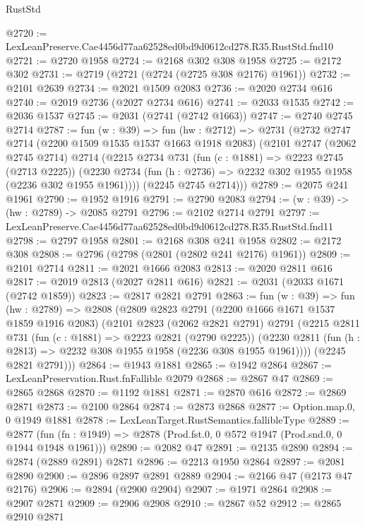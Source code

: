 \begin{lexlean}{RustStd}
\begin{coremodule}
@2720 := LexLeanPreserve.Cae4456d77aa62528ed0bd9d0612cd278.R35.RustStd.fnd10
@2721 := @2720 @1958
@2724 := @2168 @302 @308 @1958
@2725 := @2172 @302
@2731 := @2719 (@2721 (@2724 (@2725 @308 @2176) @1961))
@2732 := @2101 @2639
@2734 := @2021 @1509 @2083
@2736 := @2020 @2734 @616
@2740 := @2019 @2736 (@2027 @2734 @616)
@2741 := @2033 @1535
@2742 := @2036 @1537
@2745 := @2031 (@2741 (@2742 @1663))
@2747 := @2740 @2745 @2714
@2787 := fun (w : @39) =>
  fun (hw : @2712) =>
  @2731
    (@2732
      @2747
      @2714
      (@2200 @1509 @1535 @1537 @1663 @1918 @2083)
      (@2101
        @2747
        (@2062 @2745 @2714)
        @2714
        (@2215
          @2734
          @731
          (fun (c : @1881) => @2223 @2745 (@2713 @2225))
          (@2230 @2734 (fun (h : @2736) => @2232 @302 @1955 @1958 (@2236 @302 @1955 @1961))))
        (@2245 @2745 @2714)))
@2789 := @2075 @241 @1961
@2790 := @1952 @1916
@2791 := @2790 @2083
@2794 := (w : @39) -> (hw : @2789) -> @2085 @2791
@2796 := @2102 @2714 @2791
@2797 := LexLeanPreserve.Cae4456d77aa62528ed0bd9d0612cd278.R35.RustStd.fnd11
@2798 := @2797 @1958
@2801 := @2168 @308 @241 @1958
@2802 := @2172 @308
@2808 := @2796 (@2798 (@2801 (@2802 @241 @2176) @1961))
@2809 := @2101 @2714
@2811 := @2021 @1666 @2083
@2813 := @2020 @2811 @616
@2817 := @2019 @2813 (@2027 @2811 @616)
@2821 := @2031 (@2033 @1671 (@2742 @1859))
@2823 := @2817 @2821 @2791
@2863 := fun (w : @39) =>
  fun (hw : @2789) =>
  @2808
    (@2809
      @2823
      @2791
      (@2200 @1666 @1671 @1537 @1859 @1916 @2083)
      (@2101
        @2823
        (@2062 @2821 @2791)
        @2791
        (@2215
          @2811
          @731
          (fun (c : @1881) => @2223 @2821 (@2790 @2225))
          (@2230 @2811 (fun (h : @2813) => @2232 @308 @1955 @1958 (@2236 @308 @1955 @1961))))
        (@2245 @2821 @2791)))
@2864 := @1943 @1881
@2865 := @1942 @2864
@2867 := LexLeanPreservation.Rust.fnFallible @2079
@2868 := @2867 @47
@2869 := @2865 @2868
@2870 := @1192 @1881
@2871 := @2870 @616
@2872 := @2869 @2871
@2873 := @2100 @2864
@2874 := @2873 @2868
@2877 := Option.map.{0, 0} @1949 @1881
@2878 := LexLeanTarget.RustSemantics.fallibleType
@2889 := @2877
    (fun (fn : @1949) => @2878 (Prod.fst.{0, 0} @572 @1947 (Prod.snd.{0, 0} @1944 @1948 @1961)))
@2890 := @2082 @47
@2891 := @2135 @2890
@2894 := @2874 (@2889 @2891) @2871
@2896 := @2213 @1950 @2864
@2897 := @2081 @2890
@2900 := @2896 @2897 @2891 @2889
@2904 := @2166 @47 (@2173 @47 @2176)
@2906 := @2894 (@2900 @2904)
@2907 := @1971 @2864
@2908 := @2907 @2871
@2909 := @2906 @2908
@2910 := @2867 @52
@2912 := @2865 @2910 @2871

\end{coremodule}
\end{lexlean}
